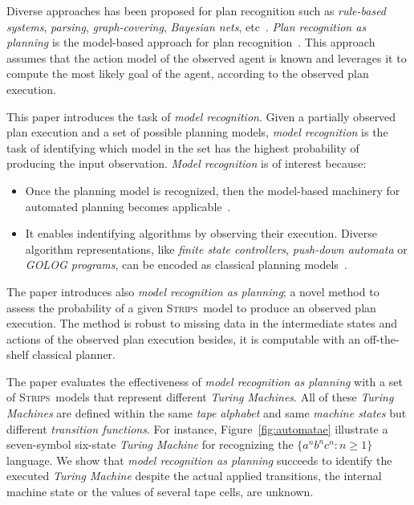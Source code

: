 \documentclass[letterpaper]{article} %
\newcommand{\strips}{\textsc{Strips}}     %
\begin{document}
Diverse approaches has been proposed for plan recognition such as {\em rule-based systems}, {\em parsing}, {\em graph-covering}, {\em Bayesian nets}, etc~\cite{carberry2001techniques}. {\em Plan recognition as planning} is the model-based approach for plan recognition~\cite{ramirez2012plan,ramirez2009plan}. This approach assumes that the action model of the observed agent is known and leverages it to compute the most likely goal of the agent, according to the observed plan execution.

This paper introduces the task of {\em model recognition}.  Given a partially observed plan execution and a set of possible planning models, {\em model recognition} is the task of identifying which model in the set has the highest probability of producing the input observation. {\em Model recognition} is of interest because:
\begin{itemize}
\item Once the planning model is recognized, then the model-based machinery for automated planning becomes applicable~\cite{ghallab2004automated}.
\item It enables indentifying algorithms by observing their execution. Diverse algorithm representations, like {\em finite state controllers}, {\em push-down automata} or {\em {\sc GOLOG} programs}, can be encoded as classical planning models~\cite{baier2007exploiting,Geffner:FSM:AAAI10,segovia2017generating}.
\end{itemize}

The paper introduces also {\em model recognition as planning}; a novel method to assess the probability of a given \strips\ model to produce an observed plan execution. The method is robust to missing data in the intermediate states and actions of the observed plan execution besides, it is computable with an off-the-shelf classical planner.

The paper evaluates the effectiveness of {\em model recognition as planning} with a set of \strips\ models that represent different {\em Turing Machines}. All of these {\em Turing Machines} are defined within the same {\em tape alphabet} and same {\em machine states} but different {\em transition functions}. For instance, Figure~\ref{fig:automatae} illustrate a seven-symbol six-state {\em Turing Machine} for recognizing the $\{a^nb^nc^n : n \geq 1 \}$ language. We show that {\em model recognition as planning} succeeds to identify the executed {\em Turing Machine} despite the actual applied transitions, the internal machine state or the values of several tape cells, are unknown.
\end{document}

